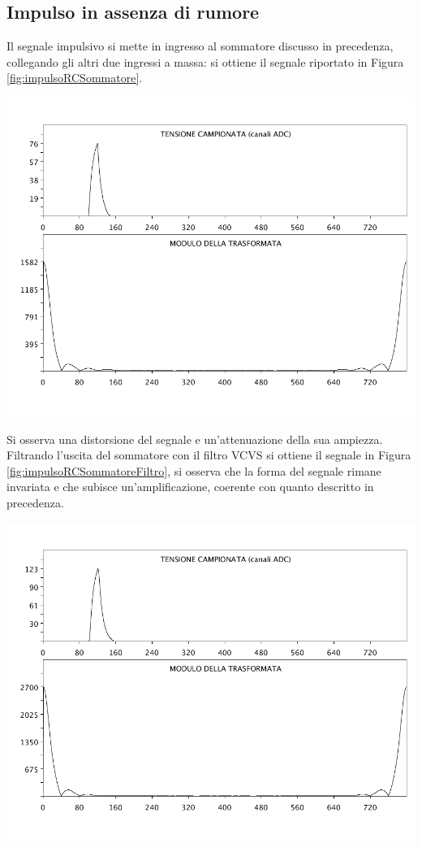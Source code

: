 \documentclass[10pt,oneside,a4paper]{article}
\newenvironment{Figure}
  {\par\medskip\noindent\minipage{\linewidth}}
  {\endminipage\par\medskip}
\begin{document}
\begin{multicols}{2}
\subsection{Impulso in assenza di rumore}
Il segnale impulsivo si mette in ingresso al sommatore discusso in precedenza, collegando gli altri due ingressi a massa: si ottiene il segnale riportato in Figura \ref{fig:impulsoRCSommatore}.
\begin{Figure}
	\begin{center}
	\includegraphics[width=\linewidth]{impulsoRCSommatore}
	\label{fig:impulsoRCSommatore}
	\end{center}
\end{Figure}
Si osserva una distorsione del segnale e un'attenuazione della sua ampiezza. Filtrando l'uscita del sommatore con il filtro VCVS si ottiene il segnale in Figura \ref{fig:impulsoRCSommatoreFiltro}, si osserva che la forma del segnale rimane invariata e che subisce un'amplificazione, coerente con quanto descritto in precedenza.
\begin{Figure}
	\begin{center}
	\includegraphics[width=\linewidth]{impulsoRCSommatoreFiltro.png}

\end{center}
\end{Figure}
\end{multicols}
\end{document}
